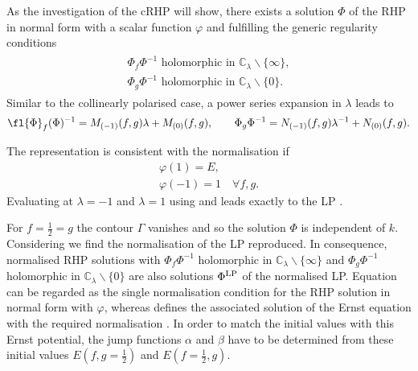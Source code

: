 \documentclass[12pt]{iopart}
\begin{document}
As the investigation of the cRHP will show, there exists a solution $\Phi$ of the RHP in normal form  with a scalar function $\varphi$ and fulfilling the generic regularity conditions 
\begin{eqnarray}\begin{array}{l}
{\Phi}_f\Phi^{-1} \mbox{ holomorphic in } \mathbb{C}_{\lambda}\backslash\{\infty\}, \\ {\Phi}_g\Phi^{-1} \mbox{ holomorphic in } \mathbb{C}_{\lambda}\backslash\{0\}.\end{array}\label{holoEigensch}
\end{eqnarray}
Similar to the collinearly polarised case, a power series expansion in $\lambda$ leads to 
\begin{eqnarray} 
\fl {\Phi}_f({\Phi})^{-1}=M_{(-1)}(f,g)\lambda+M_{(0)}(f,g), \quad\quad 
{\Phi}_g{{\Phi}}^{-1}=N_{(-1)}(f,g)\lambda^{-1}+N_{(0)}(f,g). \label{UVstruktur}
\end{eqnarray}

The representation  is consistent with the normalisation  if
\begin{eqnarray}
\varphi(1)=E, \label{DefE}\\
\varphi(-1)=1 \quad\forall f,g. \label{NormChiRHP}
\end{eqnarray}
Evaluating  at $\lambda=-1$ and $\lambda=1$ using  and  leads exactly to the LP . 

For $f=\frac12=g$ the contour $\Gamma$ vanishes and so the solution $\Phi$ is independent of $k$. Considering  we find the normalisation  of the LP reproduced. In consequence, normalised RHP solutions with ${\Phi}_f\Phi^{-1}$ holomorphic in $\mathbb{C}_{\lambda}\backslash\{\infty\}$ and ${\Phi}_g\Phi^{-1}$ holomorphic in $\mathbb{C}_{\lambda}\backslash\{0\}$
are also solutions $\Phi^{\rm LP}$ of the normalised LP. Equation  can be regarded as the single normalisation condition for the RHP solution in normal form with $\varphi$, whereas  defines the associated solution of the Ernst equation with the required normalisation . In order to match the initial values with this Ernst potential, the jump functions $\alpha$ and $\beta$ have to be determined from these initial values $E(f,g=\frac12)$ and $E(f=\frac12,g)$.
\end{document}
